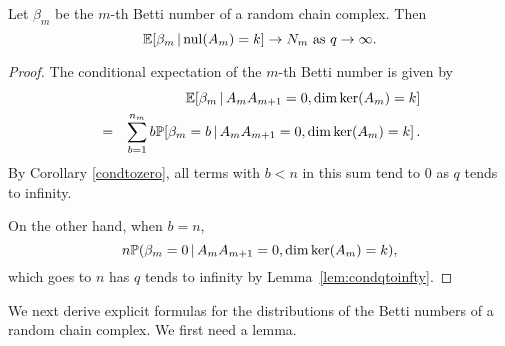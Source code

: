 \begin{corollary}
Let $\beta_m$ be the $m$-th Betti number of a random chain complex.  Then 
\[
\mathbb{E}[\beta_m \,|\, \mathrm{nul}(A_{m}) = k ] \to  N_m\textrm{ as } q\to\infty.
\]
\begin{proof}
The conditional expectation of the $m$-th Betti number is given by
	\begin{eqnarray*}
	& & \mathbb{E}[\beta_m \,|\, A_{m}A_{m+1} = 0, \dim\ker(A_{m}) = k ]\\
	&=& \sum_{b=1}^{n_m} b \mathbb{P}[\beta_m = b \,|\, A_{m}A_{m+1} = 0, \dim\ker(A_{m}) = k ] \, .
	\end{eqnarray*}
By Corollary \ref{condtozero}, all terms with $b< n$ in this sum tend to 
$0$ as $q$ tends to infinity. 

On the other hand, when $b=n$, 
\[
n\mathbb{P}(\beta_m=0\,|\, A_{m}A_{m+1} = 0, \dim\ker(A_{m}) = k ),
\]
which goes to $n$ has $q$ tends to infinity by Lemma~\ref{lem:condqtoinfty}.
\end{proof}
\end{corollary}

We next derive explicit formulas for the distributions of the Betti numbers of a random chain complex. We first need a lemma.

